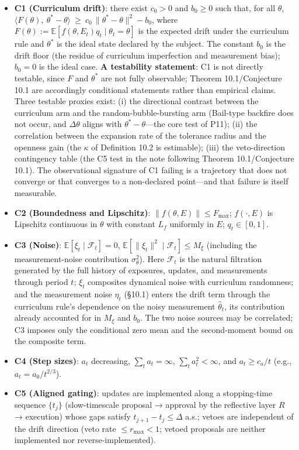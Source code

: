 \documentclass[
  11pt]{article}
\providecommand{\tightlist}{%
  \setlength{\itemsep}{0pt}\setlength{\parskip}{0pt}}
\begin{document}
\begin{itemize}
\tightlist
\item
  \textbf{C1 (Curriculum drift)}: there exist \(c_0 > 0\) and
  \(b_0 \ge 0\) such that, for all \(\theta\),
  \(\big\langle F(\theta),\ \theta^* - \theta \big\rangle \ \ge\ c_0\,\|\theta^* - \theta\|^2 - b_0\),
  where
  \(F(\theta) := \mathbb{E}[f(\theta, E_t)q_t \mid \theta_t = \theta]\)
  is the expected drift under the curriculum rule and \(\theta^*\) is
  the ideal state declared by the subject. The constant \(b_0\) is the
  drift floor (the residue of curriculum imperfection and measurement
  bias); \(b_0 = 0\) is the ideal case. \textbf{A testability
  statement}: C1 is not directly testable, since \(F\) and \(\theta^*\)
  are not fully observable; Theorem 10.1/Conjecture 10.1 are accordingly
  conditional statements rather than empirical claims. Three testable
  proxies exist: (i) the directional contrast between the curriculum arm
  and the random-bubble-bursting arm (Bail-type backfire does not occur,
  and \(\Delta\theta\) aligns with \(\theta^* - \theta\)---the core test
  of P11); (ii) the correlation between the expansion rate of the
  tolerance radius and the openness gain (the \(\kappa\) of Definition
  10.2 is estimable); (iii) the veto-direction contingency table (the C5
  test in the note following Theorem 10.1/Conjecture 10.1). The
  observational signature of C1 failing is a trajectory that does not
  converge or that converges to a non-declared point---and that failure
  is itself measurable.
\item
  \textbf{C2 (Boundedness and Lipschitz)}:
  \(\|f(\theta, E)\| \le F_{\max}\); \(f(\cdot, E)\) is Lipschitz
  continuous in \(\theta\) with constant \(L_f\) uniformly in \(E\);
  \(q_t \in [0,1]\).
\item
  \textbf{C3 (Noise)}: \(\mathbb{E}[\xi_t \mid \mathcal{F}_t] = 0\),
  \(\mathbb{E}[\|\xi_t\|^2 \mid \mathcal{F}_t] \le M_\xi\) (including
  the measurement-noise contribution \(\sigma_\theta^2\)). Here
  \(\mathcal{F}_t\) is the natural filtration generated by the full
  history of exposures, updates, and measurements through period \(t\);
  \(\xi_t\) composites dynamical noise with curriculum randomness; and
  the measurement noise \(\eta_t\) (§10.1) enters the drift term through
  the curriculum rule's dependence on the noisy measurement
  \(\hat\theta_t\), its contribution already accounted for in \(M_\xi\)
  and \(b_0\). The two noise sources may be correlated; C3 imposes only
  the conditional zero mean and the second-moment bound on the composite
  term.
\item
  \textbf{C4 (Step sizes)}: \(a_t\) decreasing, \(\sum_t a_t = \infty\),
  \(\sum_t a_t^2 < \infty\), and \(a_t \ge c_a/t\) (e.g.,
  \(a_t = a_0/t^{2/3}\)).
\item
  \textbf{C5 (Aligned gating)}: updates are implemented along a
  stopping-time sequence \(\{t_j\}\) (slow-timescale proposal → approval
  by the reflective layer \(R\) → execution) whose gaps satisfy
  \(t_{j+1} - t_j \le \Delta\) a.s.; vetoes are independent of the drift
  direction (veto rate \(\le r_{\max} < 1\); vetoed proposals are
  neither implemented nor reverse-implemented).
\end{itemize}
\end{document}
